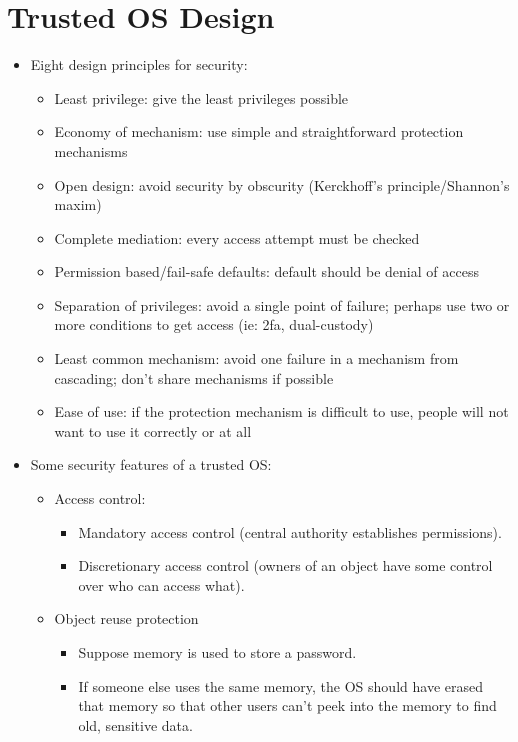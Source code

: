 \documentclass{article}
\begin{document}
\section{Trusted OS Design}
\begin{itemize}
    \item Eight design principles for security:
        \begin{itemize}
            \item Least privilege: give the least privileges possible
            \item Economy of mechanism: use simple and straightforward protection mechanisms
            \item Open design: avoid security by obscurity (Kerckhoff's principle/Shannon's maxim)
            \item Complete mediation: every access attempt must be checked
            \item Permission based/fail-safe defaults: default should be denial of access
            \item Separation of privileges: avoid a single point of failure; perhaps use two or more conditions to get access (ie: 2fa, dual-custody)
            \item Least common mechanism: avoid one failure in a mechanism from cascading; don't share mechanisms if possible
            \item Ease of use: if the protection mechanism is difficult to use, people will not want to use it correctly or at all
        \end{itemize}
    \item Some security features of a trusted OS:
        \begin{itemize}
            \item Access control:
                \begin{itemize}
                    \item Mandatory access control (central authority establishes permissions).
                    \item Discretionary access control (owners of an object have some control over who can access what).
                \end{itemize}
            \item Object reuse protection
                \begin{itemize}
                    \item Suppose memory is used to store a password.
                    \item If someone else uses the same memory, the OS should have erased that memory so that other users can't peek into the memory to find old, sensitive data.

\end{itemize}
\end{itemize}
\end{itemize}
\end{document}
